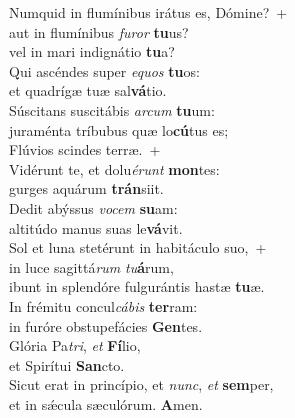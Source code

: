 \evenverse Numquid in flumínibus irátus es, Dómine?~+\\\evenverse  aut in flumínibus \textit{fu}\textit{ror} \textbf{tu}us?~\*\\
\evenverse vel in mari indignátio \textbf{tu}a?\\
\oddverse Qui ascéndes super \textit{e}\textit{quos} \textbf{tu}os:~\*\\
\oddverse et quadrígæ tuæ sal\textbf{vá}tio.\\
\evenverse Súscitans suscitábis \textit{ar}\textit{cum} \textbf{tu}um:~\*\\
\evenverse juraménta tríbubus quæ lo\textbf{cú}tus es;\\
\oddverse Flúvios scindes terræ.~+\\
\oddverse  Vidérunt te, et dolu\textit{é}\textit{runt} \textbf{mon}tes:~\*\\
\oddverse gurges aquárum \textbf{trán}siit.\\
\evenverse Dedit abýssus \textit{vo}\textit{cem} \textbf{su}am:~\*\\
\evenverse altitúdo manus suas le\textbf{vá}vit.\\
\oddverse Sol et luna stetérunt in habitáculo suo,~+\\
\oddverse  in luce sagittá\textit{rum} \textit{tu}\textbf{á}rum,~\*\\
\oddverse ibunt in splendóre fulgurántis hastæ \textbf{tu}æ.\\
\evenverse In frémitu concul\textit{cá}\textit{bis} \textbf{ter}ram:~\*\\
\evenverse in furóre obstupefácies \textbf{Gen}tes.\\
\oddverse Glória Pa\textit{tri}, \textit{et} \textbf{Fí}lio,~\*\\
\oddverse et Spirítui \textbf{San}cto.\\
\evenverse Sicut erat in princípio, et \textit{nunc}, \textit{et} \textbf{sem}per,~\*\\
\evenverse et in sǽcula sæculórum. \textbf{A}men.\\
